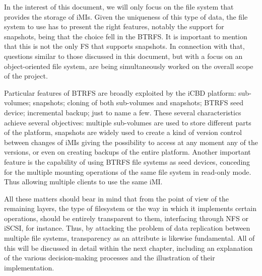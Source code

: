 In the interest of this document, we will only focus on the file system that provides the storage of iMIs. Given the uniqueness of this type of data, the file system to use has to present the right features, notably the support for snapshots, being that the choice fell in the BTRFS. It is important to mention that this is not the only FS that supports snapshots. In connection with that, questions similar to those discussed in this document, but with a focus on an object-oriented file system, are being simultaneously worked on the overall scope of the project.

Particular features of BTRFS are broadly exploited by the iCBD platform: sub-volumes; snapshots; cloning of both sub-volumes and snapshots; BTRFS seed device; incremental backup; just to name a few.
These several characteristics achieve several objectives: multiple sub-volumes are used to store different parts of the platform, snapshots are widely used to create a kind of version control between changes of iMIs giving the possibility to access at any moment any of the versions, or even on creating backups of the entire platform. 
Another important feature is the capability of using BTRFS file systems as seed devices, conceding for the multiple mounting operations of the same file system in read-only mode. Thus allowing multiple clients to use the same iMI.

All these matters should bear in mind that from the point of view of the remaining layers, the type of filesystem or the way in which it implements certain operations, should be entirely transparent to them, interfacing through NFS or iSCSI, for instance. Thus, by attacking the problem of data replication between multiple file systems, transparency as an attribute is likewise fundamental. All of this will be discussed in detail within the next chapter, including an explanation of the various decision-making processes and the illustration of their implementation.





